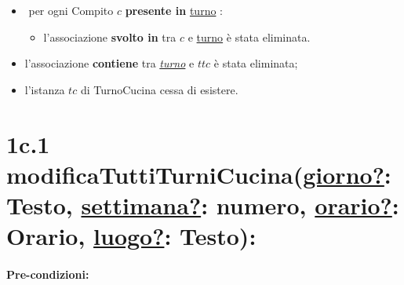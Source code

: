 \begin{itemize}
   \item \textlangle $ $ per ogni Compito $c$ \textbf{presente in} \underline{turno} \textrangle:
    \begin{itemize}
        \item l'associazione \textbf{svolto in} tra $c$ e \underline{turno} è stata eliminata.
    \end{itemize}
    \item l'associazione \textbf{contiene} tra \underline{\textit{turno}} e $ttc$ è stata eliminata;
    \item l'istanza $tc$ di TurnoCucina cessa di esistere.
\end{itemize}

\section*{1c.1 modificaTuttiTurniCucina(\underline{giorno?}: Testo, \underline{settimana?}: numero, \underline{orario?}: Orario, \underline{luogo?}: Testo):}

\paragraph{Pre-condizioni:}

